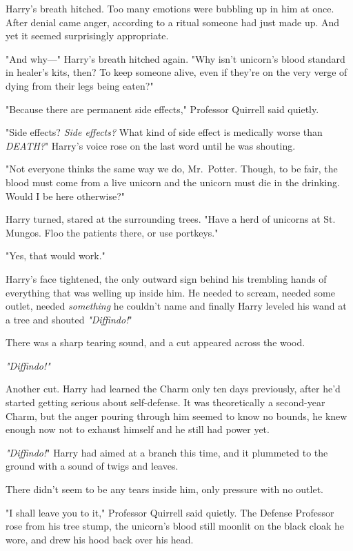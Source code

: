 Harry's breath hitched. Too many emotions were bubbling up in him at once. After denial came anger, according to a ritual someone had just made up. And yet it seemed surprisingly appropriate.

"And why---" Harry's breath hitched again. "Why isn't unicorn's blood standard in healer's kits, then? To keep someone alive, even if they're on the very verge of dying from their legs being eaten?"

"Because there are permanent side effects," Professor Quirrell said quietly.

"Side effects? \emph{Side effects?} What kind of side effect is medically worse than \emph{DEATH?}" Harry's voice rose on the last word until he was shouting.

"Not everyone thinks the same way we do, Mr.~Potter. Though, to be fair, the blood must come from a live unicorn and the unicorn must die in the drinking. Would I be here otherwise?"

Harry turned, stared at the surrounding trees. "Have a herd of unicorns at St. Mungos. Floo the patients there, or use portkeys."

"Yes, that would work."

Harry's face tightened, the only outward sign behind his trembling hands of everything that was welling up inside him. He needed to scream, needed some outlet, needed \emph{something} he couldn't name and finally Harry leveled his wand at a tree and shouted \emph{"Diffindo!}"

There was a sharp tearing sound, and a cut appeared across the wood.

\emph{"Diffindo!"}

Another cut. Harry had learned the Charm only ten days previously, after he'd started getting serious about self-defense. It was theoretically a second-year Charm, but the anger pouring through him seemed to know no bounds, he knew enough now not to exhaust himself and he still had power yet.

\emph{"Diffindo!}" Harry had aimed at a branch this time, and it plummeted to the ground with a sound of twigs and leaves.

There didn't seem to be any tears inside him, only pressure with no outlet.

"I shall leave you to it," Professor Quirrell said quietly. The Defense Professor rose from his tree stump, the unicorn's blood still moonlit on the black cloak he wore, and drew his hood back over his head.